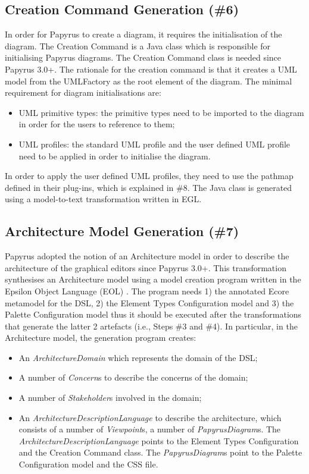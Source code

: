 \subsection{Creation Command Generation (\#6)}
\label{sec:creationCommand}
In order for Papyrus to create a diagram, it requires the initialisation of the diagram.
The Creation Command is a Java class which is responsible for initialising Papyrus diagrams. 
The Creation Command class is needed since Papyrus 3.0+.
The rationale for the creation command is that it creates a UML model from the UMLFactory as the root element of the diagram.
The minimal requirement for diagram initialisations are:
\begin{itemize}
	\item UML primitive types: the primitive types need to be imported to the diagram in order for the users to reference to them;
	\item UML profiles: the standard UML profile and the user defined UML profile need to be applied in order to initialise the diagram.
\end{itemize}

In order to apply the user defined UML profiles, they need to use the pathmap defined in their plug-ins, which is explained in \#8.
The Java class is generated using a model-to-text transformation written in EGL.

\subsection{Architecture Model Generation (\#7)}
\label{sec:architectureModel}
Papyrus adopted the notion of an Architecture model in order to describe the architecture of the graphical editors since Papyrus 3.0+.
This transformation synthesises an Architecture model using a model creation program written in the Epsilon Object Language (EOL) \cite{kolovos2006epsilon}. 
The program needs 1) the annotated Ecore metamodel for the DSL, 2) the Element Types Configuration model and 3) the Palette Configuration model thus it should be executed after the transformations that generate the latter 2 artefacts (i.e., Steps \#3 and \#4).
In particular, in the Architecture model, the generation program creates:
\begin{itemize}
	\item An \textit{ArchitectureDomain} which represents the domain of the DSL;
	\item A number of \textit{Concern}s to describe the concerns of the domain;
	\item A number of \textit{Stakeholder}s involved in the domain;
	\item An \textit{ArchitectureDescriptionLanguage} to describe the architecture, which consists of a number of \textit{Viewpoint}s, a number of \textit{PapyrusDiagram}s. 
	The \textit{ArchitectureDescriptionLanguage} points to the Element Types Configuration and the Creation Command class. 
	The \textit{PapyrusDiagram}s point to the Palette Configuration model and the CSS file.
\end{itemize}

